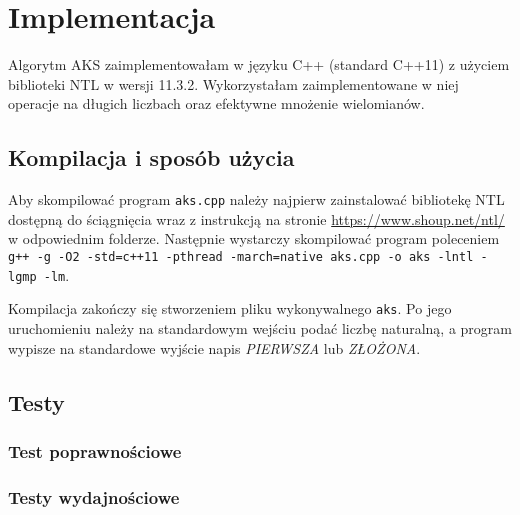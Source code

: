 \documentclass[polish,declaration,shortabstract]{iithesis}
\theoremstyle{definition}
\theoremstyle{remark} \newtheorem{observation}{Obserwacja}
\theoremstyle{plain} \newtheorem{theorem}{Twierdzenie}
\theoremstyle{plain} \newtheorem{lemma}{Lemat}
\theoremstyle{remark} \newtheorem*{remark*}{Uwaga}
\theoremstyle{reminder} \newtheorem*{reminder*}{Przypomnienie}
\begin{document}
\chapter{Implementacja}
    
Algorytm AKS zaimplementowałam w języku C++ (standard C++11) z użyciem biblioteki NTL w wersji 11.3.2. Wykorzystałam zaimplementowane w niej operacje na długich liczbach oraz efektywne mnożenie wielomianów.

\section{Kompilacja i sposób użycia}

Aby skompilować program \verb|aks.cpp| należy najpierw zainstalować bibliotekę NTL dostępną do ściągnięcia wraz z instrukcją na stronie \url{https://www.shoup.net/ntl/} w odpowiednim folderze.
Następnie wystarczy skompilować program poleceniem
\verb|g++ -g -O2 -std=c++11 -pthread -march=native aks.cpp -o aks -lntl -lgmp -lm|.

Kompilacja zakończy się stworzeniem pliku wykonywalnego \verb|aks|. Po jego uruchomieniu należy na standardowym wejściu podać liczbę naturalną, a program wypisze na standardowe wyjście napis \textit{PIERWSZA} lub \textit{ZŁOŻONA}. 

\section{Testy}
\subsection{Test poprawnościowe}
\subsection{Testy wydajnościowe}


\end{document}
